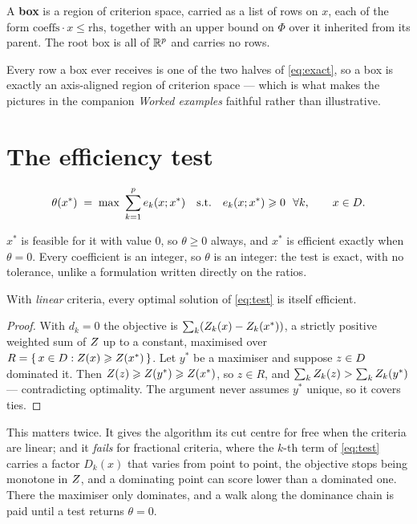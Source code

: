 \documentclass[11pt,a4paper]{article}
\begin{document}
A \textbf{box} is a region of criterion space, carried as a list of rows on
$x$, each of the form $\text{coeffs} \cdot x \leqslant \text{rhs}$, together
with an upper bound on $\Phi$ over it inherited from its parent.  The root box
is all of $\mathbb{R}^p$ and carries no rows.

Every row a box ever receives is one of the two halves of \eqref{eq:exact}, so
a box is exactly an axis-aligned region of criterion space --- which is what
makes the pictures in the companion \emph{Worked examples} faithful rather
than illustrative.

\section{The efficiency test}\label{sec:test}

\begin{equation}\label{eq:test}
  \theta(x^{*}) \;=\; \max \ \sum_{k=1}^{p} e_k(x; x^{*})
  \quad \text{s.t.} \quad e_k(x; x^{*}) \geqslant 0 \ \ \forall k, \qquad x \in D .
\end{equation}

$x^{*}$ is feasible for it with value $0$, so $\theta \geqslant 0$ always, and
$x^{*}$ is efficient exactly when $\theta = 0$.  Every coefficient is an
integer, so $\theta$ is an integer: the test is exact, with no tolerance,
unlike a formulation written directly on the ratios.

\begin{proposition}\label{prop:ecker}
With \emph{linear} criteria, every optimal solution of \eqref{eq:test} is
itself efficient.
\end{proposition}

\begin{proof}
With $d_k = 0$ the objective is $\sum_k (Z_k(x) - Z_k(x^{*}))$, a strictly
positive weighted sum of $Z$ up to a constant, maximised over
$R = \{\, x \in D : Z(x) \geqslant Z(x^{*}) \,\}$.  Let $y^{*}$ be a
maximiser and suppose $z \in D$ dominated it.  Then
$Z(z) \geqslant Z(y^{*}) \geqslant Z(x^{*})$, so $z \in R$, and
$\sum_k Z_k(z) > \sum_k Z_k(y^{*})$ --- contradicting optimality.  The
argument never assumes $y^{*}$ unique, so it covers ties.
\end{proof}

\noindent
This matters twice.  It gives the algorithm its cut centre for free when the
criteria are linear; and it \emph{fails} for fractional criteria, where the
$k$-th term of \eqref{eq:test} carries a factor $D_k(x)$ that varies from point
to point, the objective stops being monotone in $Z$, and a dominating point
can score lower than a dominated one.  There the maximiser only dominates, and
a walk along the dominance chain is paid until a test returns $\theta = 0$.
\end{document}

